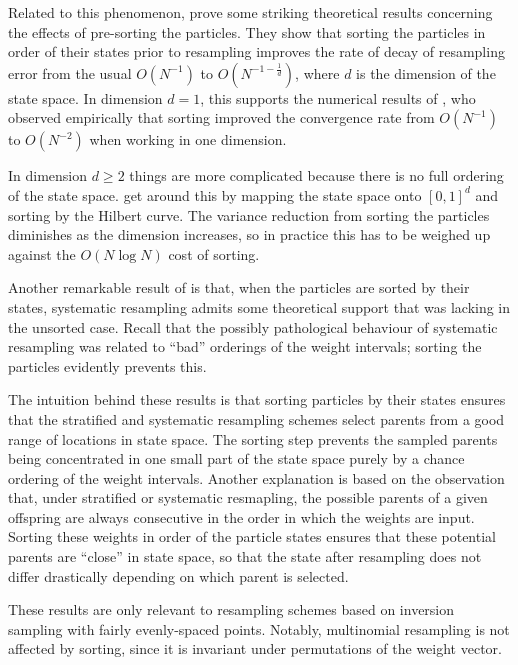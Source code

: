 Related to this phenomenon, \textcite{gerber2017} prove some striking theoretical results concerning the effects of pre-sorting the particles. They show that sorting the particles in order of their states prior to resampling improves the rate of decay of resampling error from the usual $O(N^{-1})$ to $O(N^{-1-\frac{1}{d}})$, where $d$ is the dimension of the state space. 
In dimension $d=1$, this supports the numerical results of \textcite{kitagawa1996}, who observed empirically that sorting improved the convergence rate from $O(N^{-1})$ to $O(N^{-2})$ when working in one dimension.

In dimension $d\geq2$ things are more complicated because there is no full ordering of the state space. \textcite{gerber2017} get around this by mapping the state space onto $[0,1]^d$ and sorting by the Hilbert curve. 
The variance reduction from sorting the particles diminishes as the dimension increases, so in practice this has to be weighed up against the $O(N\log N)$ cost of sorting.

Another remarkable result of \textcite{gerber2017} is that, when the particles are sorted by their states, systematic resampling admits some theoretical support that was lacking in the unsorted case.
Recall that the possibly pathological behaviour of systematic resampling was related to ``bad'' orderings of the weight intervals; sorting the particles evidently prevents this.

The intuition behind these results is that sorting particles by their states ensures that the stratified and systematic resampling schemes select parents from a good range of locations in state space. The sorting step prevents the sampled parents being concentrated in one small part of the state space purely by a chance ordering of the weight intervals.
Another explanation \parencite{li2020} is based on the observation that, under stratified or systematic resmapling, the possible parents of a given offspring are always consecutive in the order in which the weights are input. Sorting these weights in order of the particle states ensures that these potential parents are ``close'' in state space, so that the state after resampling does not differ drastically depending on which parent is selected.

These results are only relevant to resampling schemes based on inversion sampling with fairly evenly-spaced points. Notably, multinomial resampling is not affected by sorting, since it is invariant under permutations of the weight vector.





